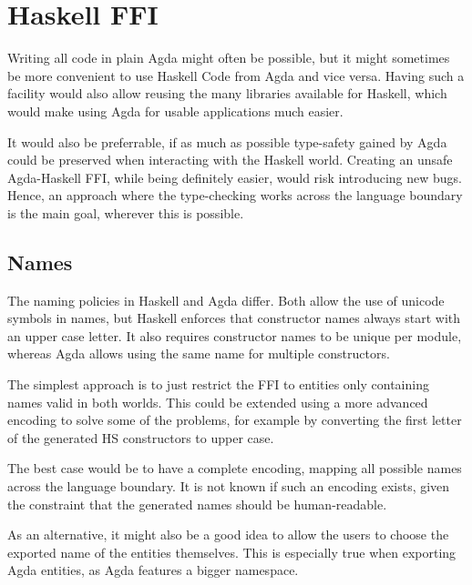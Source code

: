 \documentclass[12pt, a4paper, twoside]{report}
\begin{document}
\section{Haskell FFI}
Writing all code in plain Agda might often be possible, but it might sometimes be more
convenient to use Haskell Code from Agda and vice versa. Having such a facility would
also allow reusing the many libraries available for Haskell, which would make using Agda
for usable applications much easier.

It would also be preferrable, if as much as possible type-safety gained by Agda could be
preserved when interacting with the Haskell world. Creating an unsafe Agda-Haskell
FFI, while being definitely easier, would risk introducing new bugs. Hence, an approach
where the type-checking works across the language boundary is the main goal, wherever
this is possible.



\subsection{Names}
The naming policies in Haskell and Agda differ. Both allow the use of unicode symbols in names, but Haskell enforces
that constructor names always start with an upper case letter. It also requires constructor names to be unique
per module, whereas Agda allows using the same name for multiple constructors.

The simplest approach is to just restrict the FFI to entities only containing names valid in both worlds.
This could be extended using a more advanced encoding to solve some of the problems, for example
by converting the first letter of the generated HS constructors to upper case.

The best case would be to have a complete encoding, mapping all possible names across the language boundary. It is not known
if such an encoding exists, given the constraint that the generated names should be human-readable.

As an alternative, it might also be a good idea to allow the users to choose the exported name of the entities themselves.
This is especially true when exporting Agda entities, as Agda features a bigger namespace.
\end{document}
